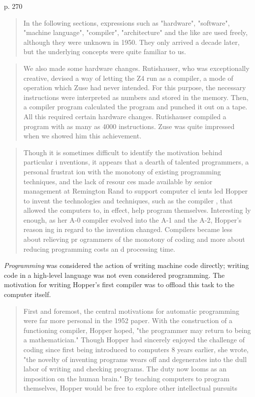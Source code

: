 p. 270
\begin{quotation}
In the following sections, expressions such as "hardware", "software", "machine language", "compiler",
"architecture" and the like are used freely, although they were unknown in 1950. They only arrived a decade
later, but the underlying concepts were quite familiar to us.
\end{quotation}

\begin{quotation}
    We also made some hardware changes. Rutishauser, who was exceptionally creative, devised a way of
letting the Z4 run as a compiler, a mode of operation which Zuse had never intended. For this purpose, the
necessary instructions were interpreted as numbers and stored in the memory. Then, a compiler program
calculated the program and punched it out on a tape. All this required certain hardware changes. Rutishauser
compiled a program with as many as 4000 instructions. Zuse was quite impressed when we showed him this
achievement.
\end{quotation}


\begin{quotation}
Though it is sometimes difficult to identify the motivation behind particular i
nventions, it appears that a dearth of talented programmers, a personal frustrat
ion with the monotony of existing programming techniques, and the lack of resour
ces made available by senior management at Remington Rand to support computer cl
ients led Hopper to invent the technologies and techniques, such as the compiler
, that allowed the computers to, in effect, help program themselves. Interesting
ly enough, as her A-0 compiler evolved into the A-1 and the A-2, Hopper’s reason
ing in regard to the invention changed. Compilers became less about relieving pr
ogrammers of the monotony of coding and more about reducing programming costs an
d processing time.
\end{quotation}

\textit{Programming} was considered the action of writing machine code directly;
writing code in a high-level language was not even considered programming.
The motivation for writing Hopper's first compiler was to offload this task
to the computer itself.

\begin{quotation}
First and
foremost, the central motivations for automatic programming
were far more personal in the 1952 paper. With the construction
of a functioning compiler, Hopper hoped, "the programmer
may return to being a mathematician." Though Hopper had
sincerely enjoyed the challenge of coding since first being introduced to computers 8 years earlier, she wrote, "the novelty of
inventing programs wears off and degenerates into the dull labor
of writing and checking programs. The duty now looms as an
imposition on the human brain." By teaching computers to
program themselves, Hopper would be free to explore other
intellectual pursuits 
\end{quotation}

